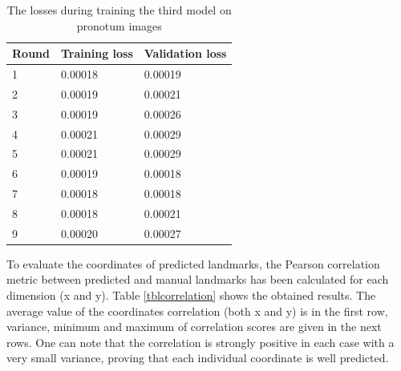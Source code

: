\documentclass[review]{elsarticle}
\begin{document}
\begin{table}[h!]
	\centering
	\begin{tabular}{l l l}
	Round & Training loss & Validation loss \\ \hline
	1 & 0.00018 & 0.00019  \\ \hline
	2 & 0.00019 & 0.00021 \\ \hline
	3 & 0.00019 & 0.00026 \\ \hline
	4 & 0.00021 & 0.00029 \\ \hline
	5 & 0.00021 & 0.00029 \\ \hline
	6 & 0.00019 & 0.00018 \\ \hline
	7 & 0.00018 & 0.00018 \\ \hline
	8 & 0.00018 & 0.00021 \\ \hline
	9 & 0.00020 & 0.00027 \\ \hline
	\end{tabular}
	\caption{\small{The losses during training the third model on pronotum images}}
	\label{tbltrainingloss}
\end{table}

To evaluate the coordinates of predicted landmarks, the Pearson
correlation  metric  between predicted and manual landmarks has been
calculated for each dimension (x and y). Table \ref {tblcorrelation}
shows the obtained results. The average value of the coordinates
correlation (both x and y) is in the first row, variance,
minimum and maximum of correlation scores are given in the next
rows. One can note that the correlation is strongly positive in each
case with a very small variance, proving that each individual
coordinate is well predicted.
\end{document}
